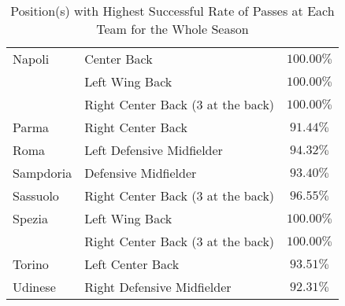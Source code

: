\begin{table}[!htbp]
\begin{tabular}{l|l|c}
Napoli         & Center Back                            & $100.00\%$                  \\
       & Left Wing Back                         & $100.00\%$                  \\
       & Right Center Back (3 at the back)      & $100.00\%$                  \\
Parma          & Right Center Back                      & $91.44\%$                   \\
Roma           & Left Defensive Midfielder              & $94.32\%$                   \\
Sampdoria      & Defensive Midfielder                   & $93.40\%$                   \\
Sassuolo       & Right Center Back (3 at the back)      & $96.55\%$                   \\
Spezia         & Left Wing Back                         & $100.00\%$                  \\
        & Right Center Back (3 at the back)      & $100.00\%$                  \\
Torino         & Left Center Back                       & $93.51\%$                   \\
Udinese        & Right Defensive Midfielder             & $92.31\%$                  
\end{tabular}
\caption{Position(s) with Highest Successful Rate of Passes at Each Team for the Whole Season}
    \label{tab:teamPositionPass}
\end{table}